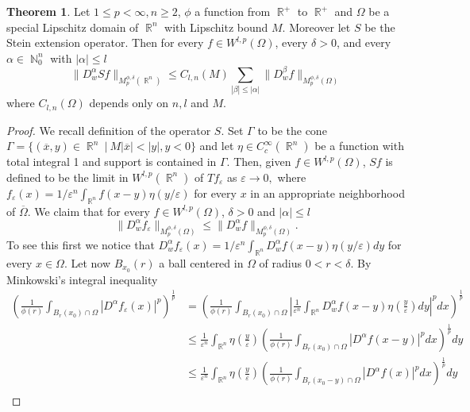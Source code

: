\documentclass[12pt]{article}
\theoremstyle{definition}
\newtheorem{theorem}{Theorem}
\DeclareMathOperator\rr{\mathbb{R}}
\DeclareMathOperator\nn{\mathbb{N}}
\begin{document}
\begin{theorem}\label{speciallip}
Let $1\le p<\infty,n\ge2$, $\phi$ a function from $\rr^+$ to $\rr^+$ and $\Omega$ be a special Lipschitz domain of $\rr^n$ with Lipschitz bound $M.$ Moreover let $S$ be the Stein extension operator. Then for every $f \in W^{l,p}(\Omega)$, every $\delta>0$, and every $\alpha \in \nn_0^n$ with $|\alpha|\le l$ 
\begin{equation}
 \| D^\alpha_w Sf\|_{M_p^{\phi,\delta}(\rr^n)}\le C_{l,n}(M)\sum_{|\beta|\le |\alpha|}\|D^\beta_w f \|_{M_p^{\phi,\delta}(\Omega)} \label{Sbound}
 \end{equation}
 where $C_{l,n}(\Omega)$ depends only on $n,l$ and $M.$

 \begin{proof}
We recall definition of the operator $S.$ Set  $\Gamma$ to be the cone $\Gamma=\{(\overline x, y) \in \rr^n \ | \ M |\overline x|<|y|, y<0 \}$ and let $\eta \in C^\infty_c(\rr^n)$ be a function with total integral 1 and support is contained in $\Gamma.$ Then, given $f \in W^{l,p}(\Omega)$, $Sf$ is defined to be the limit in $W^{l,p}(\rr^n)$ of $Tf_\varepsilon$ as $\varepsilon \to 0,$ where $f_\varepsilon(x)=1/\varepsilon^n \int_{\rr^n} f(x-y)\eta(y/\varepsilon)$ for every $x$ in an appropriate neighborhood of $	\overline \Omega$. We claim that for every $f \in W^{l,p}(\Omega)$, $\delta>0$ and $|\alpha|\le l$
\begin{equation}
\| D^\alpha_w f_\varepsilon\|_{M^{\phi,\delta}_p(\Omega)} \le \| D^\alpha_w f\|_{M^{\phi,\delta}_p(\Omega)} \label{epsbound}.
\end{equation}
To see this first we notice that $D^\alpha_w f_\varepsilon(x)=1/\varepsilon^n \int_{\rr^n} D^\alpha_w f(x-y)\eta(y/\varepsilon)dy$ for every $x \in \Omega.$ Let now $B_{x_0}(r)$ a ball centered in $\Omega$ of radius $0<r<\delta$. By Minkowski's integral inequality
\begin{align*}
 \left( \frac{1}{	\phi(r)} \int_{B_r(x_0)\cap \Omega} |D^\alpha f_\varepsilon (x)|^p \right)^{\frac{1}{p}} &= \left( \frac{1}{	\phi(r)} \int_{B_r(x_0)\cap \Omega} \left |\frac{1}{\varepsilon^n} \int_{\rr^n} D^\alpha_w f(x-y)\eta\left(\frac{y}{\varepsilon} \right)dy\right|^pdx \right)^{\frac{1}{p}} \\
 &\le \frac{1}{\varepsilon^n}  \int_{\rr^n} \eta\left(\frac{y}{\varepsilon} \right) \left (\frac{1}{	\phi(r)}  \int_{B_r(x_0)\cap \Omega} |D^\alpha f(x-y)|^p dx\right)^{\frac{1}{p}}dy \\
 &\le\frac{1}{\varepsilon^n}  \int_{\rr^n} \eta\left(\frac{y}{\varepsilon} \right)  \left (\frac{1}{	\phi(r)}  \int_{B_r(x_0-y)\cap \Omega} |D^\alpha f(x)|^p dx\right)^{\frac{1}{p}}dy \\

\end{align*}
\end{proof}
\end{theorem}
\end{document}
